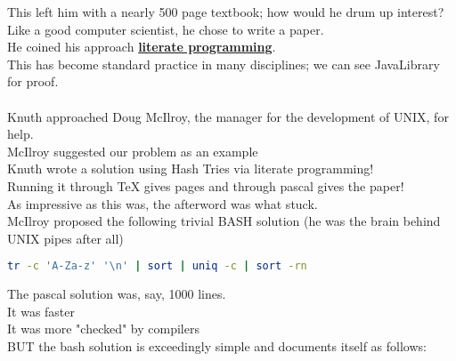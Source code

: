 \documentclass[../../lecture_notes.tex]{subfiles}
\begin{document}
\noindent This left him with a nearly 500 page textbook; how would he drum up interest?\\
Like a good computer scientist, he chose to write a paper.\\
He coined his approach \textbf{\underline{literate programming}}.\\
This has become standard practice in many disciplines; we can see JavaLibrary for proof.\\ 
\\
Knuth approached Doug McIlroy, the manager for the development of UNIX, for help.\\
McIlroy suggested our problem as an example\\
Knuth wrote a solution using Hash Tries via literate programming!\\
Running it through TeX gives pages and through pascal gives the paper!\\
\newpage
As impressive as this was, the afterword was what stuck.\\
McIlroy proposed the following trivial BASH solution (he was the brain behind UNIX pipes after all)\\
	\begin{lstlisting}[language=bash]  
	tr -c 'A-Za-z' '\n' | sort | uniq -c | sort -rn
	\end{lstlisting}
The pascal solution was, say, 1000 lines.\\
\indent It was faster\\
\indent It was more "checked" by compilers\\
BUT the bash solution is exceedingly simple and documents itself as follows:
\begin{center}\end{center}
\end{document}
